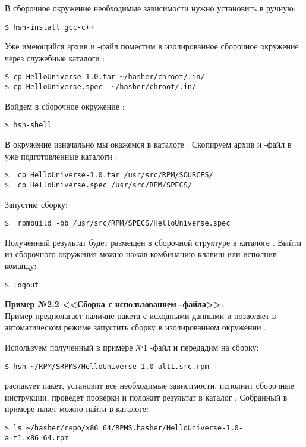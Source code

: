 В сборочное окружение необходимые зависимости нужно установить в ручную:
\begin{verbatim}
$ hsh-install gcc-c++
\end{verbatim}

Уже имеющийся архив и -файл поместим в изолированное сборочное
окружение через служебные каталоги :

\begin{verbatim}
$ cp HelloUniverse-1.0.tar ~/hasher/chroot/.in/
$ cp HelloUniverse.spec  ~/hasher/chroot/.in/
\end{verbatim}

Войдем в сборочное окружение :
\begin{verbatim}
$ hsh-shell
\end{verbatim}

В окружение  изначально мы окажемся в каталоге .
Скопируем архив и -файл в уже подготовленные каталоги :
\begin{verbatim}
$  cp HelloUniverse-1.0.tar /usr/src/RPM/SOURCES/
$  cp HelloUniverse.spec /usr/src/RPM/SPECS/
\end{verbatim}

Запустим сборку:
\begin{verbatim}
$  rpmbuild -bb /usr/src/RPM/SPECS/HelloUniverse.spec
\end{verbatim}

Полученный результат будет размещен в сборочной структуре 
в каталоге . Выйти из сборочного окружения можно
нажав комбинацию клавиш  или исполнив команду:
\begin{verbatim}
$ logout
\end{verbatim}

\textbf{Пример №2.2 <<Сборка с использованием -файла>>}:\\

Пример предполагает наличие пакета с исходными данными  и
позволяет в автоматическом режиме запустить сборку в изолированном окружении
.

Используем полученный в примере №1 -файл и передадим на сборку:
\begin{verbatim}
$ hsh ~/RPM/SRPMS/HelloUniverse-1.0-alt1.src.rpm
\end{verbatim}

 распакует пакет, установит все необходимые зависимости, исполнит
сборочные инструкции, проведет проверки и положит результат в каталог
. Собранный в примере пакет можно найти в каталоге:
\begin{verbatim}
$ ls ~/hasher/repo/x86_64/RPMS.hasher/HelloUniverse-1.0-alt1.x86_64.rpm
\end{verbatim}

